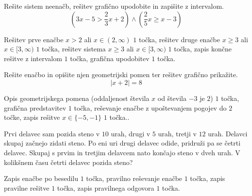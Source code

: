 \documentclass[addpoints]{exam}
\begin{document}
\begin{questions}
    

    
        

    \question[5]
    Rešite sistem neenačb, rešitev grafično upodobite in zapišite z intervalom.
    $$ \left(3x-5>\frac{2}{3}x+2\right)\land\left(\frac{2}{5}x\geq x-3\right) $$
    
    
    \begin{solution}[9cm]
        Rešitev prve enačbe $x>2$ ali $x\in(2,\infty)$ $1$ točka, rešitev druge enačbe $x\geq 3$ ali $x\in[3,\infty)$ $1$ točka, rešitev sistema $x\geq 3$ ali $x\in[3,\infty)$ $1$ točka, zapis končne rešitve z intervalom $1$ točka, grafična upodobitev $1$ točka.
    \end{solution}


    



    \newpage 

    

    \question[5]
    Rešite enačbo in opišite njen geometrijski pomen ter rešitev grafično prikažite.
    $$  \left\lvert x+2\right\rvert=8 $$
    
    
    \begin{solution}[9cm]
        Opis geometrijskega pomena (oddaljenost števila $x$ od števila $-3$ je $2$) $1$ točka, grafična predstavitev $1$ točka, reševanje enačbe z upoštevanjem pogojev do $2$ točke, zapis rešitve $x\in\{-5,-1\}$ $1$ točka..
    \end{solution}





    \question[5]
    Prvi delavec sam pozida steno v $10$ urah, drugi v $5$ urah, tretji v $12$ urah. Delavci
    skupaj začnejo zidati steno. Po eni uri drugi delavec odide, pridruži pa se četrti delavec.
    Skupaj s prvim in tretjim delavcem nato končajo steno v dveh urah. V kolikšnem času četrti delavec
    pozida steno?
    
    
    \begin{solution}[9cm]
        
        Zapis enačbe po besedilu $1$ točka, pravilno reševanje enačbe $1$ točka, zapis pravilne rešitve $1$ točka, zapis pravilnega odgovora $1$ točka.
    \end{solution}




\end{questions}
\end{document}
